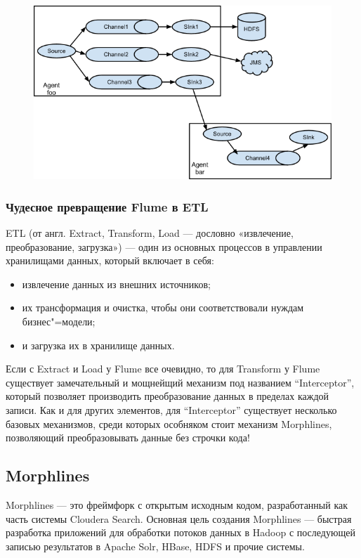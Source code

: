 \documentclass[10pt, a5paper]{article}
\begin{document}
\begin{figure}[h!]
  \centering
  \includegraphics[scale=0.5]{21_2014_UserGuide_image01.png}
\end{figure}

\subsubsection*{Чудесное превращение Flume в ETL}

ETL \cite{Pynkin2} (от англ. Extract, Transform, Load — дословно «извлечение, преобразование, загрузка») — один из основных процессов в управлении хранилищами данных, который включает в себя:

\begin{itemize}
  \item извлечение данных из внешних источников;
  \item их трансформация и очистка, чтобы они соответствовали нуждам бизнес"=модели;
  \item и загрузка их в хранилище данных.
\end{itemize}

Если с Extract и Load у Flume все очевидно, то для Transform у Flume существует замечательный и мощнейщий механизм под названием ``Interceptor'', который позволяет производить преобразование данных в пределах каждой записи.
Как и для других элементов, для ``Interceptor'' существует несколько базовых механизмов, среди которых особняком стоит механизм Morphlines, позволяющий преобразовывать данные без строчки кода!

\subsection*{Morphlines}

Morphlines  \cite{Pynkin3} --- это фреймфорк с открытым исходным кодом, разработанный как часть системы Cloudera Search. Основная цель создания Morphlines --- быстрая разработка приложений для обработки потоков данных в Hadoop с последующей записью результатов в  Apache Solr, HBase, HDFS и прочие системы.
\end{document}
